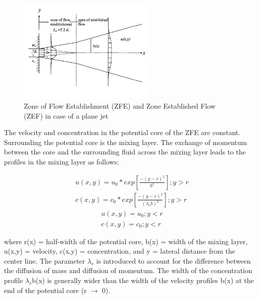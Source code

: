 \begin{figure}[ht!]
    \centering
    \includegraphics[width=0.6\textwidth]{Images/Plane_jet_flow.png}
    \caption{Zone of Flow Establishment (ZFE) and Zone Established Flow (ZEF) in case of a plane jet}
    \label{fig:zone_plane}
\end{figure}

\noindent The velocity and concentration in the potential core of the ZFE are constant. Surrounding the potential core is the mixing layer. The exchange of momentum between the core and the surrounding fluid across the mixing layer leads to the profiles in the mixing layer as follows:

\begin{equation}
\begin{split}
    & u(x,y) = u_0 * exp [\frac{- (y-r)^2}{b^2}];y > r  \\     
    & c(x,y) = c_0 * exp [\frac{- (y-r)^2} { (\lambda_r b)^2}] ; y > r
    \end{split}
\end{equation}
\begin{equation}
\begin{split}
    & u(x,y) = u_0; y < r \\     
    & c(x,y) = c_0; y < r
    \end{split}
    \label{eq:gaus}
\end{equation}

\noindent where r(x) = half-width of the potential core, b(x) = width of the mixing layer, u(x,y) = velocity, c(x,y) = concentration, and y = lateral distance from the center line. The parameter $\lambda_r$ is introduced to account for the difference between the diffusion of mass and diffusion of momentum. The width of the concentration profile $\lambda_r$b(x) is generally wider than the width of the velocity profiles b(x) at the end of the potential core (r $\rightarrow$ 0). \newline

